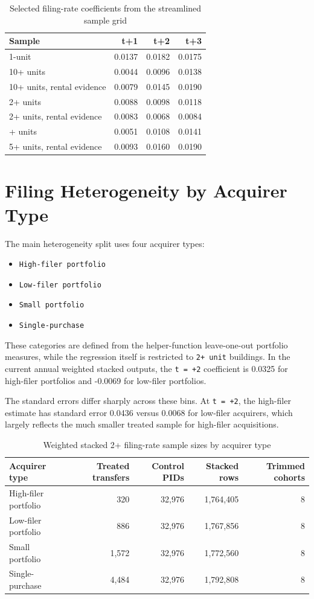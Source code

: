 \documentclass[
  11pt,
]{article}
\providecommand{\tightlist}{%
  \setlength{\itemsep}{0pt}\setlength{\parskip}{0pt}}
\begin{document}
\begin{longtable}[t]{lrrr}
\caption{\label{tab:filing-core-summary}Selected filing-rate coefficients from the streamlined sample grid}\\
\toprule
Sample & t+1 & t+2 & t+3\\
\midrule
1-unit & 0.0137 & 0.0182 & 0.0175\\
10+ units & 0.0044 & 0.0096 & 0.0138\\
10+ units, rental evidence & 0.0079 & 0.0145 & 0.0190\\
2+ units & 0.0088 & 0.0098 & 0.0118\\
2+ units, rental evidence & 0.0083 & 0.0068 & 0.0084\\
\addlinespace
5+ units & 0.0051 & 0.0108 & 0.0141\\
5+ units, rental evidence & 0.0093 & 0.0160 & 0.0190\\
\bottomrule
\end{longtable}

\section{Filing Heterogeneity by Acquirer
Type}\label{filing-heterogeneity-by-acquirer-type}

The main heterogeneity split uses four acquirer types:

\begin{itemize}
\tightlist
\item
  \texttt{High-filer\ portfolio}
\item
  \texttt{Low-filer\ portfolio}
\item
  \texttt{Small\ portfolio}
\item
  \texttt{Single-purchase}
\end{itemize}

These categories are defined from the helper-function leave-one-out
portfolio measures, while the regression itself is restricted to
\texttt{2+\ unit} buildings. In the current annual weighted stacked
outputs, the \texttt{t\ =\ +2} coefficient is 0.0325 for high-filer
portfolios and -0.0069 for low-filer portfolios.

The standard errors differ sharply across these bins. At
\texttt{t\ =\ +2}, the high-filer estimate has standard error 0.0436
versus 0.0068 for low-filer acquirers, which largely reflects the much
smaller treated sample for high-filer acquisitions.

\begin{longtable}[t]{lrrrr}
\caption{\label{tab:filing-acq-sample-table}Weighted stacked 2+ filing-rate sample sizes by acquirer type}\\
\toprule
Acquirer type & Treated transfers & Control PIDs & Stacked rows & Trimmed cohorts\\
\midrule
High-filer portfolio & 320 & 32,976 & 1,764,405 & 8\\
Low-filer portfolio & 886 & 32,976 & 1,767,856 & 8\\
Small portfolio & 1,572 & 32,976 & 1,772,560 & 8\\
Single-purchase & 4,484 & 32,976 & 1,792,808 & 8\\
\bottomrule
\end{longtable}
\end{document}
